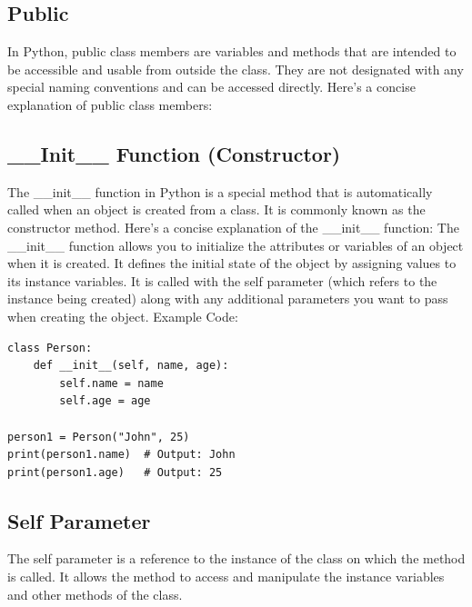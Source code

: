 \documentclass{report}
\begin{document}
    \bigbreak \noindent \bigbreak \noindent 
    \subsection{Public}
    \bigbreak \noindent 
    In Python, public class members are variables and methods that are intended to be accessible and usable from outside the class. They are not designated with any special naming conventions and can be accessed directly. Here's a concise explanation of public class members:

    \bigbreak \noindent \bigbreak \noindent 
    \subsection{\_\_Init\_\_ Function (Constructor)}
    The \_\_init\_\_ function in Python is a special method that is automatically called when an object is created from a class. It is commonly known as the constructor method. Here's a concise explanation of the \_\_init\_\_ function:
    \bigbreak \noindent 
    The \_\_init\_\_ function allows you to initialize the attributes or variables of an object when it is created. It defines the initial state of the object by assigning values to its instance variables. It is called with the self parameter (which refers to the instance being created) along with any additional parameters you want to pass when creating the object.
    \bigbreak \noindent 
    Example Code:
    \begin{verbatim}
class Person:
    def __init__(self, name, age):
        self.name = name
        self.age = age

person1 = Person("John", 25)
print(person1.name)  # Output: John
print(person1.age)   # Output: 25
    \end{verbatim}

    \bigbreak \noindent \bigbreak \noindent 
    \subsection{Self Parameter}
    The self parameter is a reference to the instance of the class on which the method is called. It allows the method to access and manipulate the instance variables and other methods of the class.

    \bigbreak \noindent \bigbreak \noindent 
\end{document}
